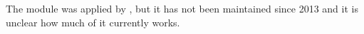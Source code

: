 The module was applied by \citet[][]{ZoelligRenner_PhDThesis_2014}, but it has not been maintained since 2013 and it is unclear how much of it currently works.


